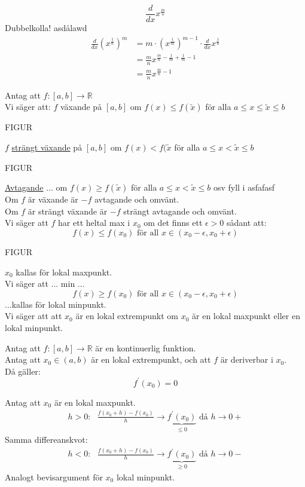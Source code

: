 \begin{Ex}
    \[
    \frac{d}{dx}x^{\frac{m}{n}}
    \]
    Dubbelkolla!   asdålawd
    \begin{align*}
    	\frac{d}{dx}(x^{\frac{1}{n}})^m &= m \cdot (x^{\frac{1}{m}})^{m-1} \cdot \frac{d}{dx} x^{\frac{1}{n}} \\
    	&= \frac{m}{n}x^{\frac{m}{n} - \frac{1}{m} + \frac{1}{m} -1} \\
    	&= \frac{m}{n}x^{\frac{m}{n}-1}
    \end{align*}
\end{Ex}

Antag att $f:[a,b] \rightarrow \mathbb{R}$\\
Vi säger att: $f$ växande på $[a,b]$ om $f(x) \le f(\tilde{x})$ för alla $a \le x \le \tilde{x} \le b$
\begin{center}
	FIGUR
\end{center}
$f$ \underline{strängt växande} på $[a,b]$ om $f(x) < f(\tilde{x}$ för alla $a \le x < \tilde{x} \le b$
\begin{center}
	FIGUR
\end{center}
\underline{Avtagande} ... om $f(x) \ge f(\tilde{x})$ för alla $a \le x < \tilde{x} \le b$ osv fyll i asfafasf\\
Om $f$ är växande är $-f$ avtagande och omvänt.\\
Om $f$ är strängt växande är $-f$ strängt avtagande och omvänt.\\
Vi säger att $f$ har ett heltal max i $x_0$ om det finns ett $\epsilon > 0$ sådant att:
\[
f(x) \le f(x_0) \mbox{ för all } x\in(x_0 - \epsilon, x_0 + \epsilon)
\]
\begin{center}
	FIGUR
\end{center}
$x_0$ kallas för lokal maxpunkt.\\
Vi säger att ... min ...
\[
f(x) \ge f(x_0) \mbox{ för all } x\in(x_0 - \epsilon, x_0 + \epsilon)
\]
...kallas för lokal minpunkt.\\
Vi säger att att $x_0$ är en lokal extrempunkt om $x_0$ är en lokal maxpunkt eller en lokal minpunkt.
\begin{sats}
    Antag att $f:[a,b] \rightarrow \mathbb{R}$ är en kontinuerlig funktion.\\
    Antag att $x_0 \in (a,b)$ är en lokal extrempunkt, och att $f$ är deriverbar i $x_0$.\\
    Då gäller:
    \[
    f ^\prime(x_0) = 0
    \]
\end{sats}
\begin{bevis}
	Antag att $x_0$ är en lokal maxpunkt.
	\begin{align*}
		h > 0: \mbox{ } \frac{f(x_0 + h) - f(x_0)}{h} \rightarrow \underbrace{f ^\prime(x_0)}_{\le 0} \mbox{ då } h \to 0+
	\end{align*}
	Samma differeanskvot:
	\begin{align*}
		h < 0: \mbox{ } \frac{f(x_0 + h)- f(x_0)}{h} \rightarrow \underbrace{f ^\prime(x_0)}_{\ge 0} \mbox{ då } h \to 0-
	\end{align*}
	Analogt bevisargument för $x_0$ lokal minpunkt.
\end{bevis}
